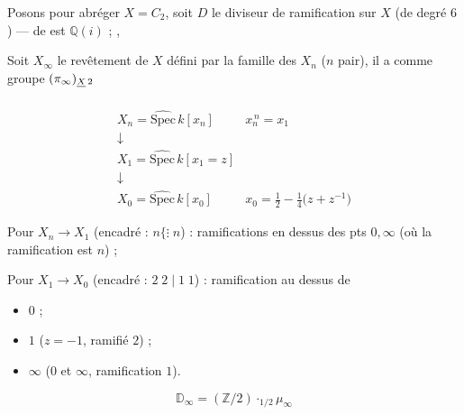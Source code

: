 \documentclass[11pt,a4paper]{article}
\begin{document}
Posons pour abréger $X = C_2$, soit $D$ le diviseur de ramification sur $X$ (de degré $6$) ---  de  est $\mathbb{Q}(i)$ ;  ,

Soit $X_\infty$ le revêtement   de $X$ défini par la famille des $X_n$ ($n$ pair), il a comme groupe $(\pi_\infty)_{\struck{X}\,2}$

\[
  \begin{array}{ll}
    X_n = \widehat{\mathrm{Spec}}\, k[x_n] & x_n^{\,n} = x_1 \\
    \downarrow & \\
    X_1 = \widehat{\mathrm{Spec}}\, k[x_1 = z] & \\
    \downarrow & \\
    X_0 = \widehat{\mathrm{Spec}}\, k[x_0] &
      x_0 = \frac12 - \frac14\bigl(z + z^{-1}\bigr)
  \end{array}
\]

Pour $X_n \to X_1$ (encadré : $n \{ \vdots\; n$) : ramifications en dessus des pts $0, \infty$ (où la ramification est $n$) ;
 

Pour $X_1 \to X_0$ (encadré : $2\;2 \mid 1\;1$) : ramification au dessus de
\begin{itemize}
  \item $0$   ;
  \item $1$ ($z = -1$, ramifié $2$)  ;
  \item $\infty$ ($0$ et $\infty$, ramification $1$).
\end{itemize}

\[
  \mathbb{D}_\infty = (\mathbb{Z}/2) \cdot_{1/2} \mu_\infty
\]
\end{document}
